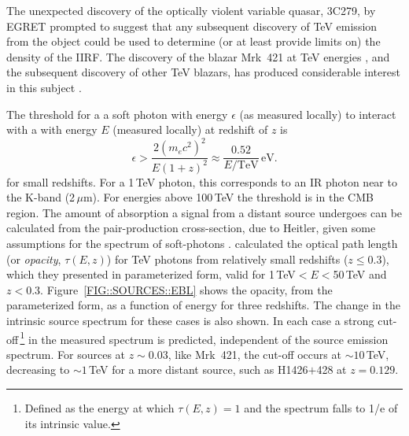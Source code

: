 The unexpected discovery of the optically violent variable quasar,
3C279, by EGRET prompted \citet{REF::STECKER::APJ1992} to suggest that
any subsequent discovery of TeV emission from the object could be used
to determine (or at least provide limits on) the density of the
IIRF. The discovery of the blazar Mrk~421 at TeV energies
\citep{REF::PUNCH::NATURE1992}, and the subsequent discovery of other
TeV blazars, has produced considerable interest in this subject
\citep[see for example][and references
therein]{REF::VASSILIEV::AP2000}.

\enlargethispage{13pt}
The threshold for a a soft photon with energy $\epsilon$ (as measured
locally) to interact with a \Gray with energy $E$ (measured locally)
at redshift of $z$ is \[\epsilon>\frac{2(m_ec^2)^2}{E(1+z)^2}
\approx\frac{0.52}{E/\mathrm{TeV}}\,\mathrm{eV.}\] for small
redshifts. For a 1\,TeV photon, this corresponds to an IR photon near
to the K-band (2\,$\mu$m). For energies above 100\,TeV the threshold
is in the CMB region. The amount of absorption a signal from a distant
source undergoes can be calculated from the pair-production
cross-section, due to Heitler, given some assumptions for the spectrum
of soft-photons \citep[see for
example][]{REF::STECKER::SSR1996}. \citet{REF::STECKER_DEJAGER::AA1998}
calculated the optical path length (or \textit{opacity}, $\tau(E,z)$)
for TeV photons from relatively small redshifts ($z\leq0.3$), which
they presented in parameterized form, valid for 1\,TeV$<E<$50\,TeV and
$z<0.3$. Figure~\ref{FIG::SOURCES::EBL} shows the opacity, from the
parameterized form, as a function of \Gray energy for three
redshifts. The change in the intrinsic source spectrum for these cases
is also shown. In each case a strong cut-off\,\footnote{Defined as the
energy at which $\tau(E,z)=1$ and the spectrum falls to 1/e of its
intrinsic value.} in the measured \Gray spectrum is predicted,
independent of the source emission spectrum. For sources at
$z\sim0.03$, like Mrk~421, the cut-off occurs at $\sim10$\,TeV,
decreasing to $\sim1$\,TeV for a more distant source, such as
H1426$+$428 at $z=0.129$.

